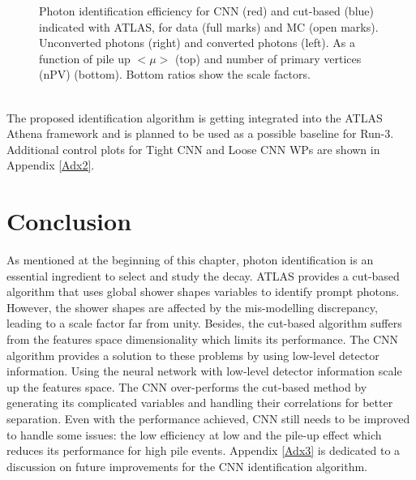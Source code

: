 \begin{figure}[htbp]
	\begin{tcolorbox}[colback=black!5!white,colframe=white!75!black]
    \caption{Photon identification efficiency for CNN (red) and cut-based (blue) indicated with ATLAS, for data (full marks) and MC (open marks). Unconverted photons (right) and converted photons (left). As a function of pile up $<\mu>$ (top) and number of primary vertices (nPV) (bottom). Bottom ratios show the scale factors.}
    \label{fig:gamma:CNN:Zllg:MU}
    \end{tcolorbox}
\end{figure}
\\
The proposed identification algorithm is getting integrated into the ATLAS Athena framework and is planned to be used as a possible baseline for Run-3. \\
Additional control plots for Tight CNN and Loose CNN WPs are shown in Appendix \ref{Adx2}.

\section{Conclusion}
\label{gamma:conc}

As mentioned at the beginning of this chapter, photon identification is an essential ingredient to select and study the \HHyybb decay. ATLAS provides a cut-based algorithm that uses global shower shapes variables to identify prompt photons. However, the shower shapes are affected by the mis-modelling discrepancy, leading to a scale factor far from unity. Besides, the cut-based algorithm suffers from the features space dimensionality which limits its performance. The CNN algorithm provides a solution to these problems by using low-level detector information. Using the neural network with low-level detector information scale up the features space. The CNN over-performs the cut-based method by generating its complicated variables and handling their correlations for better separation. Even with the performance achieved, CNN still needs to be improved to handle some issues: the low efficiency at low \eT and the pile-up effect which reduces its performance for high pile events. Appendix \ref{Adx3} is dedicated to a discussion on future improvements for the CNN identification algorithm. 
